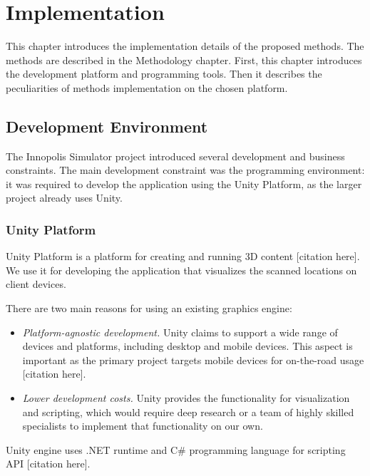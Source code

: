 \chapter{Implementation}
\label{chap:implementation}

\graphicspath{{figs/implementation/}}

This chapter introduces the implementation details of the proposed methods. The methods are described in the Methodology chapter. First, this chapter introduces the development platform and programming tools. Then it describes the peculiarities of methods implementation on the chosen platform.

\section{Development Environment}

The Innopolis Simulator project introduced several development and business constraints. The main development constraint was the programming environment: it was required to develop the application using the Unity Platform, as the larger project already uses Unity.

\subsection{Unity Platform}

Unity Platform is a platform for creating and running 3D content [citation here].  We use it for developing the application that visualizes the scanned locations on client devices.

There are two main reasons for using an existing graphics engine:

\begin{itemize}
    \item \textit{Platform-agnostic development.} Unity claims to support a wide range of devices and platforms, including desktop and mobile devices. This aspect is important as the primary project targets mobile devices for on-the-road usage [citation here].
    
    \item \textit{Lower development costs.} Unity provides the functionality for visualization and scripting, which would require deep research or a team of highly skilled specialists to implement that functionality on our own.
\end{itemize}

Unity engine uses .NET runtime and C\# programming language for scripting API [citation here].

